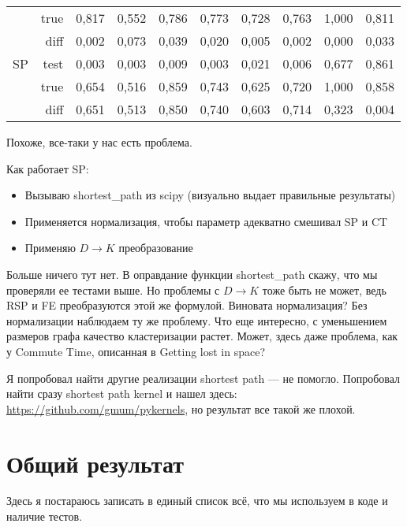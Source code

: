 \documentclass{article}
\begin{document}
\begin{table}[H]
\begin{tabular}{rr|rrrrrrrr}
       & true & 0,817        & 0,552        & 0,786        & 0,773        & 0,728        & 0,763        & 1,000   & 0,811    \\
       & diff & 0,002        & 0,073        & 0,039        & 0,020        & 0,005        & 0,002        & 0,000   & 0,033    \\
       \cline{2-10}
SP     & test & 0,003        & 0,003        & 0,009        & 0,003        & 0,021        & 0,006        & 0,677   & 0,861    \\
       & true & 0,654        & 0,516        & 0,859        & 0,743        & 0,625        & 0,720        & 1,000   & 0,858    \\
       & diff & \cellcolor{red!25} 0,651 & \cellcolor{red!25} 0,513 & \cellcolor{red!25} 0,850 &
                    \cellcolor{red!25} 0,740 & \cellcolor{red!25} 0,603 & \cellcolor{red!25} 0,714 & \cellcolor{yellow!25} 0,323   & 0,004   
\end{tabular}
\end{table}

Похоже, все-таки у нас есть проблема.

Как работает SP:
\begin{itemize}
  \item Вызываю shortest\_path из scipy (визуально выдает правильные результаты)
  \item Применяется нормализация, чтобы параметр адекватно смешивал SP и CT
  \item Применяю $D \rightarrow K$ преобразование
\end{itemize}

Больше ничего тут нет. В оправдание функции shortest\_path скажу, что мы проверяли ее тестами выше. Но проблемы с $D \rightarrow K$ тоже быть не может, ведь RSP и FE преобразуются этой же формулой.
Виновата нормализация? Без нормализации наблюдаем ту же проблему. Что еще интересно, с уменьшением размеров графа качество кластеризации растет. Может, здесь даже проблема, как у Commute Time, описанная в Getting lost in space?

Я попробовал найти другие реализации shortest path --- не помогло. Попробовал найти сразу shortest path kernel и нашел здесь: \url{https://github.com/gmum/pykernels}, но результат все такой же плохой.

\section*{Общий результат}
Здесь я постараюсь записать в единый список всё, что мы используем в коде и наличие тестов.
\end{document}
